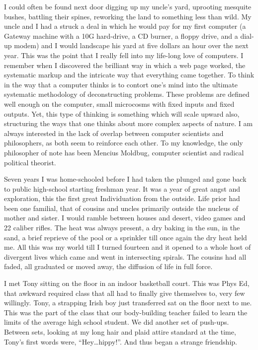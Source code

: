 \documentclass[ebook, 10pt, openright, onecolumn]{memoir}
\newcommand*\td[1]{
  \todo[inline]{
     #1 
  }
}
\newcommand*\finish{\td{ ----- Finish this section -----}}
\begin{document}
I could often be found next door digging up my uncle's yard, uprooting mesquite
bushes, battling their spines, reworking the land to something less than wild.
My uncle and I had a struck a deal in which he would pay for my first computer
(a Gateway machine with a 10G hard-drive, a CD burner, a floppy drive, and a
dial-up modem) and I would landscape his yard at five dollars an hour over the
next year.  This was the point that I really fell into my life-long love of
computers.  I remember when I discovered the brilliant way in which a web page
worked, the systematic markup and the intricate way that everything came
together.  To think in the way that a computer thinks is to contort one's mind
into the ultimate systematic methodology of deconstructing problems.  These
problems are defined well enough on the computer, small microcosms with fixed
inputs and fixed outputs.  Yet, this type of thinking is something which will
scale upward also, structuring the ways that one thinks about more complex
aspects of nature.  I am always interested in the lack of overlap between
computer scientists and philosophers, as both seem to reinforce each other. To
my knowledge, the only philosopher of note has been Mencius Moldbug, computer
scientist and radical political theorist.  

\finish

Seven years I was home-schooled before I had taken the plunged and gone back to
public high-school starting freshman year.  It was a year of great angst and
exploration, this the first great Individuation from the outside.  Life prior
had been one familial, that of cousins and uncles primarily outside the nucleus
of mother and sister.  I would ramble between houses and desert, video games and
22 caliber rifles.  The heat was always present, a dry baking in the sun, in the
sand, a brief reprieve of the pool or a sprinkler till once again the dry heat
held me.  All this was my world till I turned fourteen and it opened to a whole
host of divergent lives which came and went in intersecting spirals.  The
cousins had all faded, all graduated or moved away, the diffusion of life in
full force.

I met Tony sitting on the floor in an indoor basketball court.  This was Phys
Ed, that awkward required class that all had to finally give themselves to, very
few willingly.  Tony, a strapping Irish boy just transferred sat on the floor
next to me. This was the part of the class that our body-building teacher failed
to learn the limits of the average high school student.  We did another set of
push-ups. Between sets, looking at my long hair and plaid attire standard at the
time, Tony's first words were, ``Hey\ldots hippy!''.  And thus began a strange
friendship.
\end{document}
